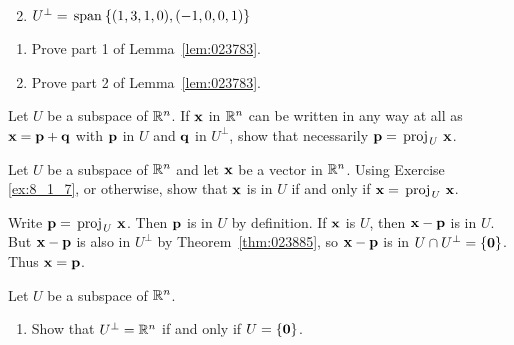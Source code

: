 \begin{multicols}{2}
\begin{ex}
\begin{enumerate}[label={\alph*.}]
\end{enumerate}
\begin{sol}
\begin{enumerate}[label={\alph*.}]
\setcounter{enumi}{1}
\item  $U^\perp = \thinspace\operatorname{span\medspace}\{(1, 3, 1, 0), (-1, 0, 0, 1)\}$

\end{enumerate}
\end{sol}
\end{ex}

\begin{ex}\label{ex:8_1_6}
\begin{enumerate}[label={\alph*.}]
\item Prove part 1 of Lemma~\ref{lem:023783}.

\item Prove part 2 of Lemma~\ref{lem:023783}.

\end{enumerate}
\end{ex}

\begin{ex} \label{ex:8_1_7}
Let $U$ be a subspace of $\mathbb{R}^n$. If $\textbf{x}$ in $\mathbb{R}^n$ can be written in any way at all as $\textbf{x} = \textbf{p} + \textbf{q}$ with $\textbf{p}$ in $U$ and $\textbf{q}$ in $U^\perp$, show that necessarily $\textbf{p} = \thinspace\operatorname{proj\medspace}_{\!U}\,{\textbf{x}}$.
\end{ex}

\begin{ex}
Let $U$ be a subspace of $\mathbb{R}^n$ and let $\textbf{x}$ be a vector in $\mathbb{R}^n$. Using Exercise \ref{ex:8_1_7}, or otherwise, show that $\textbf{x}$ is in $U$ if and only if $\textbf{x} = \thinspace\operatorname{proj\medspace}_{\!U}\,{\textbf{x}}$.

\begin{sol}
Write $\textbf{p} = \thinspace\operatorname{proj\medspace}_{\!U}\,{\textbf{x}}$. Then $\textbf{p}$ is in $U$ by definition. If $\textbf{x}$ is $U$, then $\textbf{x} - \textbf{p}$ is in $U$. But $\textbf{x} - \textbf{p}$ is also in $U^\perp$ by Theorem~\ref{thm:023885}, so $\textbf{x} - \textbf{p}$ is in $U \cap U^\perp = \{\textbf{0}\}$. Thus $\textbf{x} = \textbf{p}$.
\end{sol}
\end{ex}

\begin{ex}
Let $U$ be a subspace of $\mathbb{R}^n$.


\begin{enumerate}[label={\alph*.}]
\item Show that $U^\perp = \mathbb{R}^n$ if and only if $U = \{\textbf{0}\}$.


\end{enumerate}
\end{ex}
\end{multicols}
